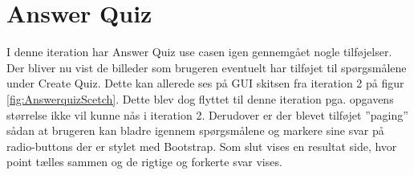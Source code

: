 \section{Answer Quiz}

I denne iteration har Answer Quiz use casen igen gennemgået nogle tilføjelser. Der bliver nu vist de billeder som brugeren eventuelt har tilføjet til spørgsmålene under Create Quiz. Dette kan allerede ses på GUI skitsen fra iteration 2 på figur \ref{fig:AnswerquizScetch}. Dette blev dog flyttet til denne iteration pga. opgavens størrelse ikke vil kunne nås i iteration 2. Derudover er der blevet tilføjet ''paging'' sådan at brugeren kan bladre igennem spørgsmålene og markere sine svar på radio-buttons der er stylet med Bootstrap.
Som slut vises en resultat side, hvor point tælles sammen og de rigtige og forkerte svar vises.